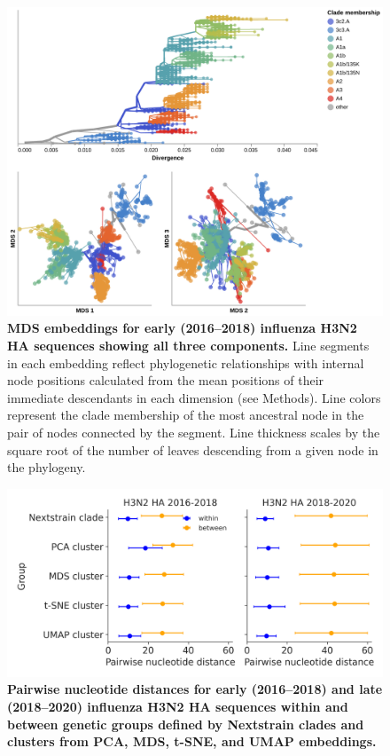 \begin{figure}[!h]
\includegraphics[width=\columnwidth]{figures/flu-2016-2018-mds-by-clade.png}
\caption{{\bf MDS embeddings for early (2016--2018) influenza H3N2 HA sequences showing all three components.}
Line segments in each embedding reflect phylogenetic relationships with internal node positions calculated from the mean positions of their immediate descendants in each dimension (see Methods).
Line colors represent the clade membership of the most ancestral node in the pair of nodes connected by the segment.
Line thickness scales by the square root of the number of leaves descending from a given node in the phylogeny.}\label{S_Fig_early_flu_mds_embeddings}
\end{figure}

\begin{figure}[!h]
\includegraphics[width=\columnwidth]{figures/within_between_influenza.png}
\caption{{\bf Pairwise nucleotide distances for early (2016--2018) and late (2018--2020) influenza H3N2 HA sequences within and between genetic groups defined by Nextstrain clades and clusters from PCA, MDS, t-SNE, and UMAP embeddings.}}\label{S_Fig_flu_within_between_group_distances}
\end{figure}

